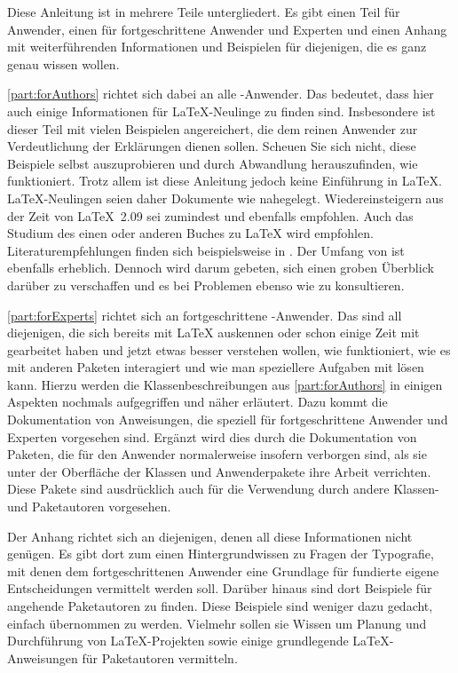 Diese Anleitung ist in mehrere Teile untergliedert. Es gibt einen Teil für
Anwender, einen für fortgeschrittene Anwender und Experten und einen Anhang
mit weiterführenden Informationen und Beispielen für diejenigen, die es ganz
genau wissen wollen.

\autoref{part:forAuthors} richtet sich dabei an alle \KOMAScript-Anwender. Das
bedeutet, dass hier auch einige Informationen für \LaTeX-Neulinge zu finden
sind. Insbesondere ist dieser Teil mit vielen Beispielen angereichert, die dem
reinen Anwender zur Verdeutlichung der Erklärungen dienen sollen. Scheuen Sie
sich nicht, diese Beispiele selbst auszuprobieren und durch Abwandlung
herauszufinden, wie \KOMAScript{} funktioniert. Trotz allem ist diese
Anleitung jedoch keine Einführung in \LaTeX. \LaTeX-Neulingen seien daher
Dokumente wie \cite{l2kurz} nahegelegt. Wiedereinsteigern aus der Zeit von
\LaTeX~2.09 sei zumindest \cite{latex:usrguide} und ebenfalls
\cite{latex:usrguide-historic} empfohlen. Auch das Studium des einen oder
anderen Buches zu \LaTeX{} wird empfohlen.  Literaturempfehlungen finden sich
beispielsweise in \cite{DANTE:FAQ}. Der Umfang von \cite{DANTE:FAQ} ist
ebenfalls erheblich. Dennoch wird darum gebeten, sich einen groben Überblick
darüber zu verschaffen und es bei Problemen ebenso wie  zu konsultieren.

\autoref{part:forExperts} richtet sich an fortgeschrittene
\KOMAScript-Anwender. Das sind all diejenigen, die sich bereits mit \LaTeX{}
auskennen oder schon einige Zeit mit \KOMAScript{} gearbeitet haben und jetzt
etwas besser verstehen wollen, wie \KOMAScript{} funktioniert, wie es mit
anderen Paketen interagiert und wie man speziellere Aufgaben mit \KOMAScript{}
lösen kann. Hierzu werden die Klassenbeschreibungen aus
\autoref{part:forAuthors} in einigen Aspekten nochmals aufgegriffen und näher
erläutert. Dazu kommt die Dokumentation von Anweisungen, die speziell für
fortgeschrittene Anwender und Experten vorgesehen sind. Ergänzt wird dies
durch die Dokumentation von Paketen, die für den Anwender normalerweise insofern
verborgen sind, als sie unter der Oberfläche der Klassen und Anwenderpakete
ihre Arbeit verrichten. Diese Pakete sind ausdrücklich auch für die Verwendung
durch andere Klassen- und Paketautoren vorgesehen.

Der Anhang richtet sich
an diejenigen, denen all diese Informationen nicht genügen. Es gibt dort zum
einen Hintergrundwissen zu Fragen der Typografie, mit denen dem
fortgeschrittenen Anwender eine Grundlage für fundierte eigene Entscheidungen
vermittelt werden soll. Darüber hinaus sind dort Beispiele für angehende
Paketautoren zu finden. Diese Beispiele sind weniger dazu gedacht, einfach
übernommen zu werden. Vielmehr sollen sie Wissen um Planung und Durchführung
von \LaTeX-Projekten sowie einige grundlegende \LaTeX-Anweisungen für
Paketautoren vermitteln.


